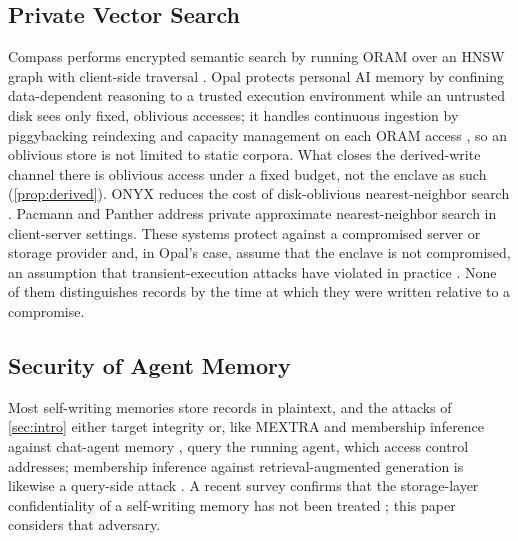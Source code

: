 \subsection{Private Vector Search}

Compass performs encrypted semantic search by running ORAM over an HNSW graph with client-side
traversal \cite{zhu2025compass}. Opal protects personal AI memory by confining data-dependent
reasoning to a trusted execution environment while an untrusted disk sees only fixed, oblivious
accesses; it handles continuous ingestion by piggybacking reindexing and capacity management on
each ORAM access \cite{kaviani2026opal}, so an oblivious store is not limited to static corpora.
What closes the derived-write channel there is oblivious access under a fixed budget, not the
enclave as such (\cref{prop:derived}). ONYX reduces the cost of
disk-oblivious nearest-neighbor search \cite{rathee2026onyx}. Pacmann \cite{zhou2025pacmann} and
Panther \cite{li2025panther} address private approximate nearest-neighbor search in client-server
settings. These systems protect against a compromised server or storage provider and, in Opal's
case, assume that the enclave is not compromised, an assumption that transient-execution attacks
have violated in practice \cite{vanbulck2018foreshadow}. None of them distinguishes records by the
time at which they were written relative to a compromise.

\subsection{Security of Agent Memory}

Most self-writing memories store records in plaintext, and the attacks of \cref{sec:intro}
either target integrity or, like MEXTRA \cite{mextra2025} and membership inference against
chat-agent memory \cite{mrmmia2026}, query the running agent, which access control addresses; membership inference against
retrieval-augmented generation is likewise a query-side attack \cite{anderson2024rag}. A
recent survey confirms that the storage-layer confidentiality of a self-writing memory has not been
treated \cite{survey2026ltmsecurity}; this paper considers that adversary.
